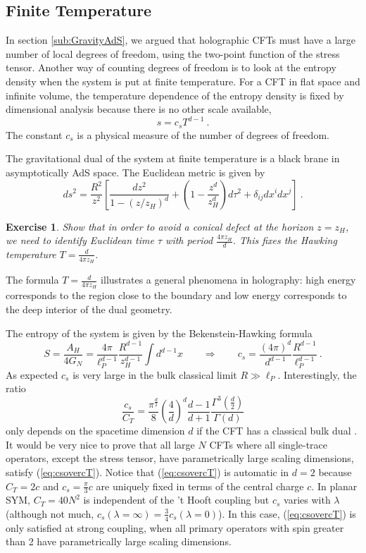 \documentclass{ws-rv9x6}
\newtheorem{exercise}{Exercise}[section]
\newcommand\be{\begin{equation}}
\newcommand\ee{\end{equation}}
\begin{document}
\subsection{Finite Temperature \label{sub:Finite-Temperature}}

In section \ref{sub:GravityAdS}, we argued that holographic CFTs
must have a large number of local degrees of freedom, using the two-point
function of the stress tensor. Another way of counting degrees of
freedom is to look at the entropy density when the system is put at
finite temperature. For a CFT in flat space and infinite volume, the
temperature dependence of the entropy density is fixed by dimensional
analysis because there is no other scale available,
\be
s=c_{s}T^{d-1}\ .
\ee
The constant $c_{s}$ is a physical measure of the number of degrees
of freedom. 

The gravitational dual of the system at finite temperature is a black
brane in asymptotically AdS space. The Euclidean metric is given by
\be
ds^{2}=\frac{R^{2}}{z^{2}}\left[\frac{dz^{2}}{1-(z/z_{H})^{d}}+\left(1-\frac{z^{d}}{z_{H}^{d}}\right)d\tau^{2}+\delta_{ij}dx^{i}dx^{j}\right]\ .
\ee
\begin{exercise} 
Show that in order to avoid a conical defect at the
horizon $z=z_{H}$, we need to identify Euclidean time $\tau$ with
period $\frac{4\pi z_{H}}{d}$. This fixes the Hawking temperature
$T=\frac{d}{4\pi z_{H}}$.
\end{exercise} 
The formula $T=\frac{d}{4\pi z_{H}}$ illustrates a general phenomena
in holography: high energy corresponds to the region close to the
boundary and low energy corresponds to the deep interior of the dual
geometry.

The entropy of the system is given by the Bekenstein-Hawking formula
\be
S=\frac{A_{H}}{4G_{N}}=\frac{4\pi}{\ell_{P}^{d-1}}\frac{R^{d-1}}{z_{H}^{d-1}}\int d^{d-1}x\qquad\Rightarrow\qquad c_{s}=\frac{(4\pi)^{d}}{d^{d-1}}\frac{R^{d-1}}{\ell_{P}^{d-1}}\ .
\ee
As expected $c_{s}$ is very large in the bulk classical limit $R\gg\ell_{P}$.
Interestingly, the ratio
\begin{equation}
\frac{c_{s}}{C_{T}}=\frac{\pi^{\frac{d}{2}}}{8}\left(\frac{4}{d}\right)^{d}\frac{d-1}{d+1}\frac{\Gamma^{3}\left(\frac{d}{2}\right)}{\Gamma(d)}\label{eq:csovercT}
\end{equation}
only depends on the spacetime dimension $d$ if the CFT has a classical
bulk dual \cite{arXiv:0801.2785}. It would be very nice to prove
that all large $N$ CFTs where all single-trace operators, except
the stress tensor, have parametrically large scaling dimensions, satisfy
(\ref{eq:csovercT}). Notice that (\ref{eq:csovercT}) is automatic
in $d=2$ because $C_{T}=2c$ and $c_{s}=\frac{\pi}{3}c$ are uniquely
fixed in terms of the central charge $c$. In planar SYM, $C_{T}=40N^{2}$
is independent of the 't Hooft coupling but $c_{s}$ varies with $\lambda$
(although not much, $c_{s}(\lambda=\infty)=\frac{3}{4}c_{s}(\lambda=0)$).
In this case, (\ref{eq:csovercT}) is only satisfied at strong coupling,
when all primary operators with spin greater than 2 have parametrically
large scaling dimensions. 
\end{document}
